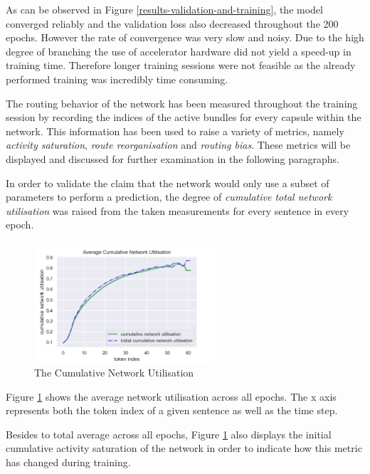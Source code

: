 As can be observed in Figure \ref{results-validation-and-training},
the model converged reliably and the validation
loss also decreased throughout the 200 epochs.
However the rate of convergence was very slow
and noisy. 
Due to the high degree of branching
the use of accelerator hardware did not yield
a speed-up in training time. Therefore longer training sessions were not feasible 
as the already performed training was incredibly time
consuming. 


\clearpage

The routing behavior of the network has been measured
throughout the training session by recording
the indices of the active bundles for every
capsule within the network.
This information has been used to raise
a variety of metrics, namely
\textit{activity saturation}, 
\textit{route reorganisation} and
\textit{routing bias}.
These metrics will be displayed and discussed for further examination in the following paragraphs.\linebreak

In order to validate the claim that the network 
would only use a subset of parameters to perform
a prediction, the degree of \textit{cumulative total 
network utilisation} was raised from the taken measurements for every sentence in every epoch.

\begin{figure}
  \centering 
  \includegraphics[width=0.60\textwidth]{PICs/Results/cumulative-network-utilisation.png}
  \caption{The Cumulative Network Utilisation}
  \label{results-network-utilisation}
\end{figure}


Figure \ref{results-network-utilisation} shows
the average network utilisation across all epochs.
The x axis represents both the token index of a given sentence as well as the time step.

Besides to total average across all epochs,
Figure \ref{results-network-utilisation} also displays
the initial cumulative activity saturation of the 
network in order to indicate how this metric 
has changed during training.


